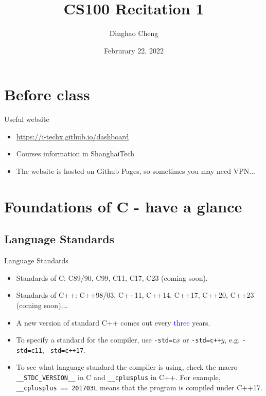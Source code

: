 \documentclass{beamer}
\title{CS100 Recitation 1}
\author{Dinghao Cheng}
\institute{ \textbf{Special thanks: GKxx}}
\date{Februrary 22, 2022}
\newcommand{\blue}[1]{\textcolor{blue}{#1}}
\begin{document}
\begin{frame}
    \titlepage
\end{frame}


\section{Before class}
\begin{frame}{Useful website}
    \begin{itemize}
        \item \url{https://i-techx.github.io/dashboard}
        \item Courses information in ShanghaiTech
        \item The website is hosted on Github Pages, so sometimes you may need VPN...
    \end{itemize}
\end{frame}
\section{Foundations of C - have a glance}

\subsection{Language Standards}

\begin{frame}{Language Standards}
    \begin{itemize}
        \item Standards of C: C89/90, C99, C11, C17, C23 (coming soon).
        \item Standards of C++: C++98/03, C++11, C++14, C++17, C++20, C++23 (coming soon),\dots
        \pause
        \item A new version of standard C++ comes out every \blue{three} years.
        \pause
        \item To specify a standard for the compiler, use \texttt{-std=c}\(x\) or \texttt{-std=c++}\(y\), e.g. \texttt{-std=c11}, \texttt{-std=c++17}.
        \pause
        \item To see what language standard the compiler is using, check the macro \texttt{\_\_STDC\_VERSION\_\_} in C and \texttt{\_\_cplusplus} in C++. For example, \texttt{\_\_cplusplus == 201703L} means that the program is compiled under C++17.
    \end{itemize}
\end{frame}
\end{document}
